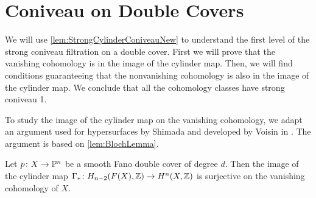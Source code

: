 \section{Coniveau on Double Covers}
\label{sec:ConiveauLinearSpace}
We will use \cref{lem:StrongCylinderConiveauNew} to understand the first level of the strong coniveau filtration on a double cover. First we will prove that the vanishing cohomology is in the image of the cylinder map. Then, we will find conditions guaranteeing that the nonvanishing cohomology is also in the image of the cylinder map. We conclude that all the cohomology classes have strong coniveau 1.

To study the image of the cylinder map on the vanishing cohomology, we adapt an argument used for hypersurfaces by Shimada \cite[Theorem 2-ii]{ShimadaHypersurfaces} and developed by Voisin in \cite[1.13]{VoisinConiveauThreefolds}. The argument is based on \cref{lem:BlochLemma}.
\begin{proposition}
\label{prop:SurjectiveVanishing}
	Let $p \colon X \to \mathbb{P}^n$ be a smooth Fano double cover of degree $d$. Then the image of the cylinder map $\Gamma_* \colon H_{n-2}(F(X),\mathbb{Z}) \to H^n(X,\mathbb{Z})$ is surjective on the vanishing cohomology of $X$.
\end{proposition}

